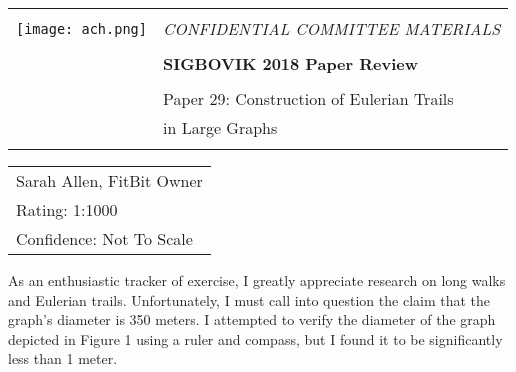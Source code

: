 \documentclass[12pt]{article}
\begin{document}
{\sffamily
\begin{tabular}{ll}
\multirow{3}{*}{\texttt{[image: ach.png]}}\\
& \Large{\em CONFIDENTIAL COMMITTEE MATERIALS} \\
&\\
& \textbf{\Huge{SIGBOVIK 2018 Paper Review}} \\
&\\
& \LARGE{Paper 29: Construction of Eulerian Trails} \\[0.25em]
& \LARGE{in Large Graphs} \\
&\\
\hline
\end{tabular}}
\vspace{2em}
\thispagestyle{empty}

{\large\bf
\begin{tabular}{l}
Sarah Allen, FitBit Owner \\
Rating: 1:1000 \\
Confidence: Not To Scale \\
\end{tabular}}
\vspace{1em}

As an enthusiastic tracker of exercise,
I greatly appreciate research on long walks and Eulerian trails.
Unfortunately, I must call into question the claim that the graph's diameter is 350 meters.
I attempted to verify the diameter of the graph depicted in Figure 1 using a ruler and compass,
but I found it to be significantly less than 1 meter.
\end{document}
